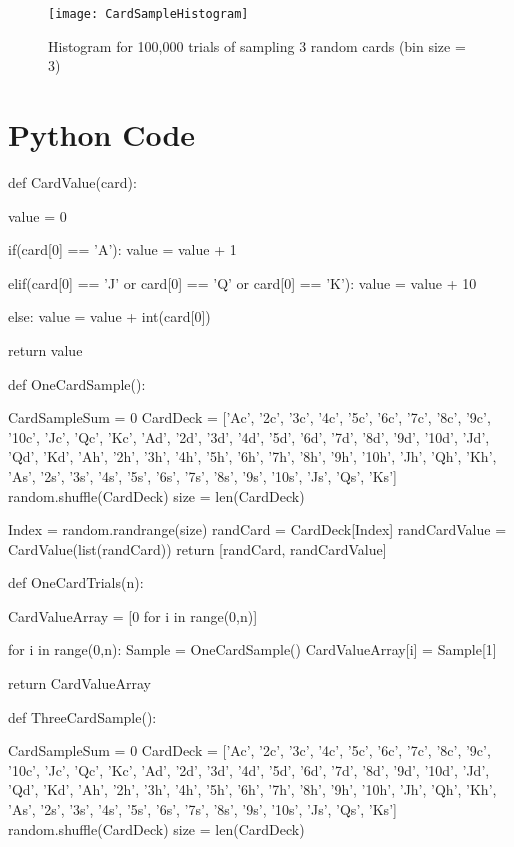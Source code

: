\documentclass[12pt]{amsart}
\begin{document}
\begin{figure}[h]
    \centering
    \texttt{[image: CardSampleHistogram]}
    \caption{Histogram for 100,000 trials of sampling 3 random cards (bin size = 3)}
    \label{fig:CardSampleHistogram}
\end{figure}

\section{Python Code}
\label{PythonCode}
\begin{python}
def CardValue(card):
    
    value = 0
    
    if(card[0] == 'A'):
        value = value + 1
        
    elif(card[0] == 'J' or card[0] == 'Q' or card[0] == 'K'):
        value = value + 10
        
    else:
        value = value + int(card[0])
        
    return value

def OneCardSample():
    
    CardSampleSum = 0
    CardDeck = ['Ac', '2c', '3c', '4c', '5c', '6c', '7c', '8c', '9c',
     '10c', 'Jc', 'Qc', 'Kc', 'Ad', '2d', '3d', '4d', '5d', '6d', '7d', 
     '8d', '9d', '10d', 'Jd', 'Qd', 'Kd', 'Ah', '2h', '3h', '4h', '5h',
     '6h', '7h', '8h', '9h', '10h', 'Jh', 'Qh', 'Kh', 'As', '2s', '3s',
     '4s', '5s', '6s', '7s', '8s', '9s', '10s', 'Js', 'Qs', 'Ks']
    random.shuffle(CardDeck)
    size = len(CardDeck)
    
    Index = random.randrange(size)
    randCard = CardDeck[Index]
    randCardValue = CardValue(list(randCard))
    return [randCard, randCardValue]

def OneCardTrials(n):
    
    CardValueArray = [0 for i in range(0,n)]
    
    for i in range(0,n):
        Sample = OneCardSample()
        CardValueArray[i] = Sample[1]
        
    return CardValueArray


def ThreeCardSample():
    
    CardSampleSum = 0
    CardDeck = ['Ac', '2c', '3c', '4c', '5c', '6c', '7c', '8c', '9c',
     '10c', 'Jc', 'Qc', 'Kc', 'Ad', '2d', '3d', '4d', '5d', '6d', '7d', 
     '8d', '9d', '10d', 'Jd', 'Qd', 'Kd', 'Ah', '2h', '3h', '4h', '5h',
     '6h', '7h', '8h', '9h', '10h', 'Jh', 'Qh', 'Kh', 'As', '2s', '3s',
     '4s', '5s', '6s', '7s', '8s', '9s', '10s', 'Js', 'Qs', 'Ks']
    random.shuffle(CardDeck)
    size = len(CardDeck)
    

\end{python}
\end{document}
